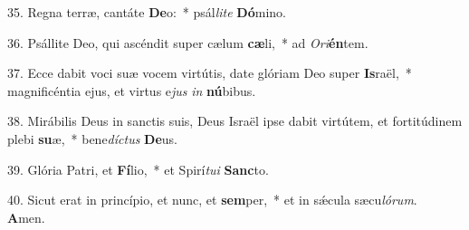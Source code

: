 35. Regna terræ, cantáte \textbf{De}o:~*  psál\textit{li}\textit{te} \textbf{Dó}mino.\

36. Psállite Deo, qui ascéndit super cælum \textbf{cæ}li,~*  ad \textit{O}\textit{ri}\textbf{én}tem.\

37. Ecce dabit voci suæ vocem virtútis, date glóriam Deo super \textbf{Is}raël,~*  magnificéntia ejus, et virtus e\textit{jus} \textit{in} \textbf{nú}bibus.\

38. Mirábilis Deus in sanctis suis, Deus Israël ipse dabit virtútem, et fortitúdinem plebi \textbf{su}æ,~*  bene\textit{díc}\textit{tus} \textbf{De}us.\

39. Glória Patri, et \textbf{Fí}lio,~*  et Spirí\textit{tu}\textit{i} \textbf{Sanc}to.\

40. Sicut erat in princípio, et nunc, et \textbf{sem}per,~*  et in sǽcula sæcu\textit{ló}\textit{rum}. \textbf{A}men.\

